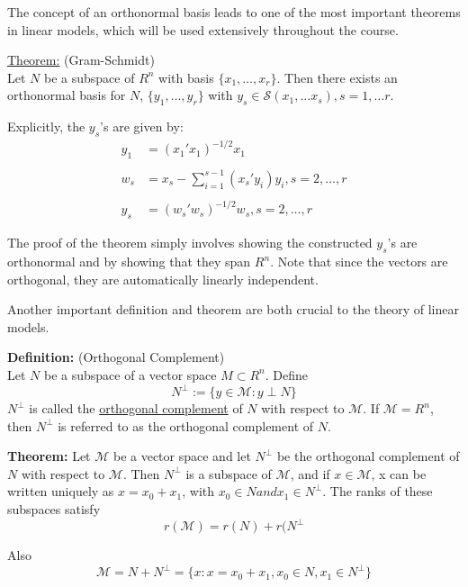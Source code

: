 \documentclass[12pt]{article}
\numberwithin{equation}{section}
\begin{document}
The concept of an orthonormal basis leads to one of the most important theorems in linear models, which will be used extensively throughout the course.

\underline{Theorem:} (Gram-Schmidt) \\
Let $N$ be a subspace of $R^n$ with basis $\{x_1, \ldots, x_r \}$. Then there exists an orthonormal basis for $N$, $\{y_1, \ldots, y_r\}$ with $y_s \in \mathcal{S}(x_1, \ldots x_s), s = 1, \ldots r$.

Explicitly, the $y_s$'s are given by:
\begin{align*}
  y_1 &= (x_1' x_1)^{-1/2} x_1 \\
  \\
  w_s &= x_s - \sum_{i = 1}^{s-1} (x_s' y_i) y_i, s = 2, \ldots, r \\
  \\
  y_s &= (w_s' w_s)^{-1/2} w_s, s = 2, \ldots, r
\end{align*}

The proof of the theorem simply involves showing the constructed $y_s$'s are orthonormal and by showing that they span $R^n$. Note that since the vectors are orthogonal, they are automatically linearly independent.

Another important definition and theorem are both crucial to the theory of linear models.

\textbf{Definition:} (Orthogonal Complement)\\
Let $N$ be a subspace of a vector space $M \subset R^n$. Define
\begin{equation*}
  N^{\perp} := \{y \in \mathcal{M}: y \perp N \}
\end{equation*}
$N^{\perp}$ is called the \underline{orthogonal complement} of $N$ with respect to $\mathcal{M}$. If $\mathcal{M} = R^n$, then $N^{\perp}$ is referred to as the orthogonal complement of $N$.

\textbf{Theorem:} Let $\mathcal{M}$ be a vector space and let $N^{\perp}$ be the orthogonal complement of $N$ with respect to $\mathcal{M}$. Then $N^{\perp}$ is a subspace of $\mathcal{M}$, and if $x \in \mathcal{M}$, x can be written uniquely as $x = x_0 + x_1$, with $x_0 \in N and x_1 \in N^{\perp}$. The ranks of these subspaces satisfy
\begin{equation*}
  r(\mathcal{M}) = r(N) + r(N^{\perp}
\end{equation*}

Also
\begin{equation*}
  \mathcal{M} = N + N^{\perp} = \{x: x = x_0 + x_1, x_0 \in N, x_1 \in N^{\perp} \}
\end{equation*}
\end{document}
